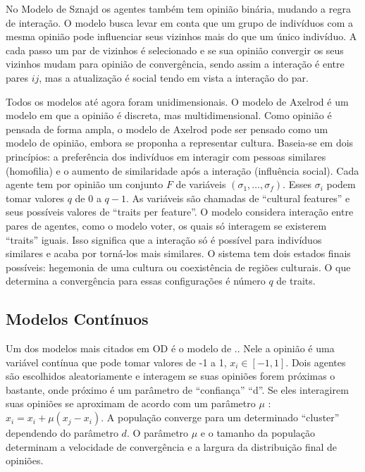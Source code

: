 No Modelo de Sznajd os agentes também tem opinião binária, mudando a regra de
interação. O modelo busca levar em conta que um grupo de indivíduos com a mesma
opinião pode influenciar seus vizinhos mais do que um único indivíduo. A cada
passo um par de vizinhos é selecionado e se sua opinião convergir os seus
vizinhos mudam para opinião de convergência, sendo assim a interação é entre
pares $ij$, mas a atualização é social tendo em vista a interação do par.


Todos os modelos até agora foram unidimensionais. O modelo de Axelrod é um
modelo em que a opinião é discreta, mas multidimensional. Como opinião é pensada
de forma ampla, o modelo de Axelrod pode ser pensado como um modelo de opinião,
embora se proponha a representar cultura. Baseia-se em dois princípios: a
preferência dos indivíduos em interagir com pessoas similares (homofilia) e o
aumento de similaridade após a interação (influência social). Cada agente tem
por opinião um conjunto $F$ de variáveis $(\sigma_1 , \ldots, \sigma_f)$. Esses $\sigma_i$ podem
tomar valores $q$ de 0 a $q-1$. As variáveis são chamadas de ``cultural
features'' e seus possíveis valores de ``traits per feature''. O modelo
considera interação entre pares de agentes, como o modelo voter, os quais só
interagem se existerem ``traits'' iguais. Isso significa que a interação só é
possível para indivíduos similares e acaba por torná-los mais similares. O
sistema tem dois estados finais possíveis: hegemonia de uma cultura ou
coexistência de regiões culturais. O que determina a convergência para essas
configurações é número $q$ de traits.



\subsection{Modelos Contínuos}



\quad \quad Um dos modelos mais citados em OD é o modelo de
..
Nele a opinião é uma variável contínua que pode tomar valores de -1 a 1, $x_i \in
[-1,1]$. Dois agentes são escolhidos aleatoriamente e interagem se suas opiniões
forem próximas o bastante, onde próximo é um parâmetro de ``confiança'' ``d''.
Se eles interagirem suas opiniões se aproximam de acordo com um parâmetro $\mu$ :
$x_i = x_i + \mu(x_j - x_i)$. A população converge para um determinado ``cluster''
dependendo do parâmetro $d$. O parâmetro $\mu$ e o tamanho da população determinam
a velocidade de convergência e a largura da distribuição final de opiniões.


